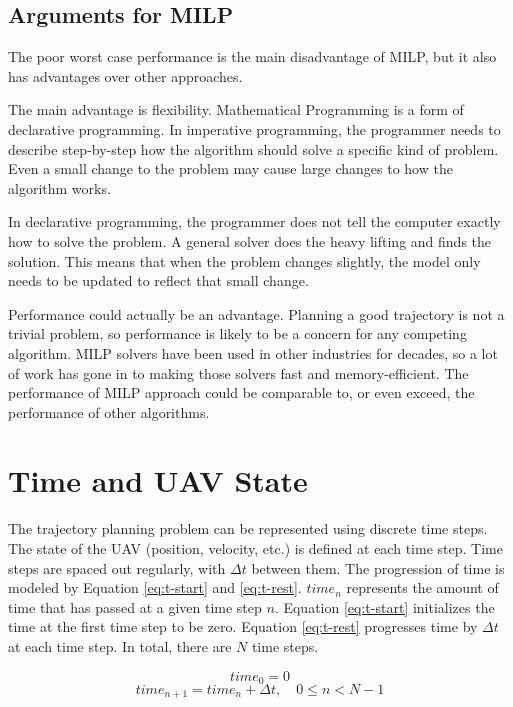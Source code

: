 \subsection{Arguments for MILP}
The poor worst case performance is the main disadvantage of MILP, but it also has advantages over other approaches.
\par
The main advantage is flexibility. Mathematical Programming is a form of declarative programming. In imperative programming, the programmer needs to describe step-by-step how the algorithm should solve a specific kind of problem. Even a small change to the problem may cause large changes to how the algorithm works.
\par
In declarative programming, the programmer does not tell the computer exactly how to solve the problem. A general solver does the heavy lifting and finds the solution. This means that when the problem changes slightly, the model only needs to be updated to reflect that small change. 
\par
Performance could actually be an advantage. Planning a good trajectory is not a trivial problem, so performance is likely to be a concern for any competing algorithm. MILP solvers have been used in other industries for decades, so a lot of work has gone in to making those solvers fast and memory-efficient. The performance of MILP approach could be comparable to, or even exceed, the performance of other algorithms.
\section{Time and UAV State}
\label{subsec:state}

The trajectory planning problem can be represented using discrete time steps. The state of the UAV (position, velocity, etc.) is defined at each time step. Time steps are spaced out regularly, with $\Delta t$ between them. The progression of time is modeled by Equation \ref{eq:t-start} and \ref{eq:t-rest}. $time_n$ represents the amount of time that has passed at a given time step $n$. Equation \ref{eq:t-start} initializes the time at the first time step to be zero. Equation \ref{eq:t-rest} progresses time by $\Delta t$ at each time step. In total, there are $N$ time steps.

\begin{equation}
\label{eq:t-start}
time_0 = 0
\end{equation}
\begin{equation}
\label{eq:t-rest}
time_{n+1} = time_{n} + \Delta t,  \quad 0 \leq n < N - 1
\end{equation}

